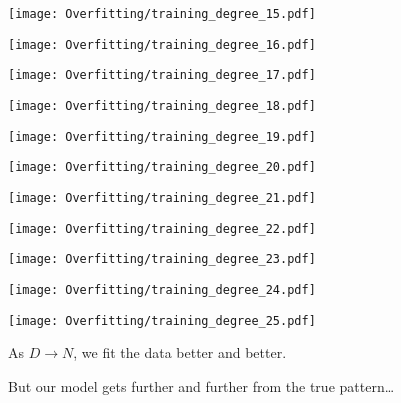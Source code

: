\documentclass[xcolor=pdftex,dvipsnames,table]{beamer}
\begin{document}
\frame
{
	\begin{center}
		\texttt{[image: Overfitting/training\_degree\_15.pdf]}
	\end{center}
}
\frame
{
	\begin{center}
		\texttt{[image: Overfitting/training\_degree\_16.pdf]}
	\end{center}
}
\frame
{
	\begin{center}
		\texttt{[image: Overfitting/training\_degree\_17.pdf]}
	\end{center}
}
\frame
{
	\begin{center}
		\texttt{[image: Overfitting/training\_degree\_18.pdf]}
	\end{center}
}
\frame
{
	\begin{center}
		\texttt{[image: Overfitting/training\_degree\_19.pdf]}
	\end{center}
}
\frame
{
	\begin{center}
		\texttt{[image: Overfitting/training\_degree\_20.pdf]}
	\end{center}
}
\frame
{
	\begin{center}
		\texttt{[image: Overfitting/training\_degree\_21.pdf]}
	\end{center}
}
\frame
{
	\begin{center}
		\texttt{[image: Overfitting/training\_degree\_22.pdf]}
	\end{center}
}
\frame
{
	\begin{center}
		\texttt{[image: Overfitting/training\_degree\_23.pdf]}
	\end{center}
}
\frame
{
	\begin{center}
		\texttt{[image: Overfitting/training\_degree\_24.pdf]}
	\end{center}
}
\frame
{
	\begin{center}
		\texttt{[image: Overfitting/training\_degree\_25.pdf]}
	\end{center}
}

\frame
{
	As $D \to N$, we fit the data better and better.
}

\frame
{
	But our model gets further and further from the true pattern\ldots
}
\end{document}

